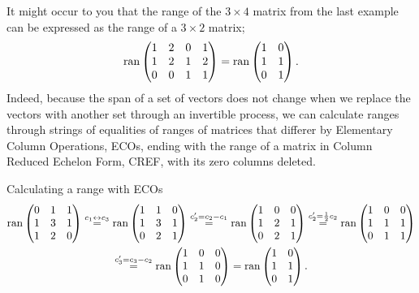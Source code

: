It might occur to you that the range of the $3\times 4$ matrix from the last example can be expressed as the range of a $3\times 2$ matrix;
\[
{\rm ran} 
\begin{pmatrix} 
1&2&0&1\\
1&2&1&2\\
0&0&1&1
\end{pmatrix} 
={\rm ran} 
\begin{pmatrix} 
1&0\\
1&1\\
0&1
\end{pmatrix}.\]
Indeed, because the span of a set of vectors does not change when we replace the vectors with another set through an invertible process, we can calculate ranges through strings of equalities of ranges of matrices that differer by Elementary Column Operations, ECOs, ending with the range of a matrix in Column Reduced Echelon Form, CREF, with its zero columns deleted.

\begin{example} Calculating a range with ECOs\\
\begin{gather*}
{\rm ran} 
\begin{pmatrix} 
0&1&1\\
1&3&1\\
1&2&0
\end{pmatrix} 
\stackrel{c_1 \leftrightarrow c_3}{=}
{\rm ran} 
\begin{pmatrix} 
1&1&0\\
1&3&1\\
0&2&1
\end{pmatrix} 
\stackrel{c_2'= c_2-c_1}{=}
{\rm ran} 
\begin{pmatrix} 
1&0&0\\
1&2&1\\
0&2&1
\end{pmatrix} 
\stackrel{c_2'= \frac12 c_2}{=}
{\rm ran} 
\begin{pmatrix} 
1&0&0\\
1&1&1\\
0&1&1
\end{pmatrix} 
\\\stackrel{c_3'= c_3-c_2}{=}
{\rm ran} 
\begin{pmatrix} 
1&0&0\\
1&1&0\\
0&1&0
\end{pmatrix} 
={\rm ran} 
\begin{pmatrix} 
1&0\\
1&1\\
0&1
\end{pmatrix}. 
\end{gather*}


\end{example}

